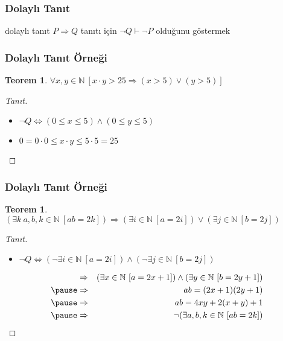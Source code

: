 \documentclass[dvipsnames]{beamer}
\theoremstyle{definition}
\theoremstyle{example}
\theoremstyle{plain}
\newtheorem{teorem}[theorem]{Teorem}
\begin{document}
\begin{frame}
  \frametitle{Dolaylı Tanıt}

  \begin{block}{dolaylı tanıt}
    $P \Rightarrow Q$ tanıtı için $\neg Q \vdash \neg P$ olduğunu göstermek
  \end{block}
\end{frame}

\begin{frame}
  \frametitle{Dolaylı Tanıt Örneği}

  \begin{teorem}
    $\forall x,y \in \mathbb{N}~[x \cdot y > 25
      \Rightarrow (x > 5) \vee (y > 5)]$
  \end{teorem}

  \pause
  \begin{proof}[Tanıt]
    \begin{itemize}
      \item $\neg Q \Leftrightarrow (0 \leq x \leq 5) \wedge (0 \leq y \leq 5)$

      \pause
      \item $0 = 0 \cdot 0 \leq x \cdot y \leq 5 \cdot 5 = 25$
    \end{itemize}
  \end{proof}
\end{frame}

\begin{frame}
  \frametitle{Dolaylı Tanıt Örneği}

  \begin{teorem}
    $(\exists k~a,b,k \in \mathbb{N}~[ab=2k]) \Rightarrow
      (\exists i \in \mathbb{N}~[a=2i]) \vee
      (\exists j \in \mathbb{N}~[b=2j])$
  \end{teorem}

  \pause
  \begin{proof}[Tanıt]
    \begin{itemize}
      \item $\neg Q \Leftrightarrow (\neg \exists i \in \mathbb{N}~[a=2i])
                          \wedge (\neg \exists j \in \mathbb{N}~[b=2j])$
    \end{itemize}

    \pause
    \begin{eqnarray*}
      & \Rightarrow & (\exists x \in \mathbb{N}~[a=2x+1])
               \wedge (\exists y \in \mathbb{N}~[b=2y+1])\\\pause
      & \Rightarrow & ab=(2x+1)(2y+1)\\\pause
      & \Rightarrow & ab=4xy+2(x+y)+1\\\pause
      & \Rightarrow & \neg (\exists a,b,k \in \mathbb{N}~[ab=2k])
    \end{eqnarray*}
  \end{proof}
\end{frame}
\end{document}
